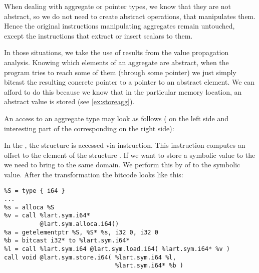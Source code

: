 When dealing with aggregate or pointer types, we know that they are not
abstract, so we do not need to create abstract operations, that manipulates
them. Hence the original instructions manipulating aggregates remain
untouched, except the instructions that extract or insert scalars to them.

In those situations, we take the use of results from the value propagation analysis.
Knowing which elements of an aggregate are abstract, when the program tries to
reach some of them (through some pointer) we just simply bitcast
the resulting concrete pointer to a pointer to an abstract element. We can afford
to do this because we know that in the particular memory location, an abstract value is
stored (see \autoref{ex:storeagg}).

\begin{example}\label{ex:storeagg}
An access to an aggregate type may look as follows (\Cpp{} on the left side and interesting
part of the corresponding \LLVM on the right side):

\noindent
{}
\hfill
{}

\bigskip
\noindent
In the \LLVM, the structure  is accessed via 
instruction. This instruction computes an offset to the element  of
the structure . If we want to store a symbolic value  to
the  we need to bring  to the same domain. We perform this
by  of  to the symbolic value. After the
transformation the \LLVM bitcode looks like this:
\begin{verbatim}
%S = type { i64 }
...
%s = alloca %S
%v = call %lart.sym.i64*
          @lart.sym.alloca.i64()
%a = getelementptr %S, %S* %s, i32 0, i32 0
%b = bitcast i32* to %lart.sym.i64*
%l = call %lart.sym.i64 @lart.sym.load.i64( %lart.sym.i64* %v )
call void @lart.sym.store.i64( %lart.sym.i64 %l,
                               %lart.sym.i64* %b )
\end{verbatim}
\end{example}

